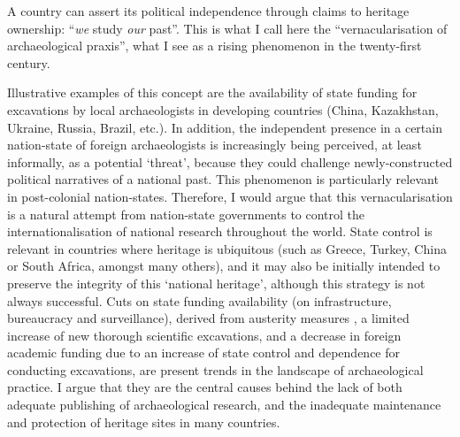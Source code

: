         A country can assert its political independence through claims to heritage ownership: “\emph{we} study \emph{our} past”. This is what I call here the “vernacularisation of archaeological praxis”, what I see as a rising phenomenon in the twenty-first century. 

        Illustrative examples of this concept are the availability of state funding for excavations by local archaeologists in developing countries (China, Kazakhstan, Ukraine, Russia, Brazil, etc.). In addition, the independent presence in a certain nation-state of foreign archaeologists is increasingly being perceived, at least informally, as a potential ‘threat’, because they could challenge newly-constructed political narratives of a national past. This phenomenon is particularly relevant in post-colonial nation-states.
        Therefore, I would argue that this vernacularisation is a natural attempt from nation-state governments to control the internationalisation of national research throughout the world. State control is relevant in countries where heritage is ubiquitous (such as Greece, Turkey, China or South Africa, amongst many others), and it may also be initially intended to preserve the integrity of this ‘national heritage’, although this strategy is not always successful. Cuts on state funding availability (on infrastructure, bureaucracy and surveillance), derived from austerity measures \parencite{Phillips_2012}, a limited increase of new thorough scientific excavations, and a decrease in foreign academic funding due to an increase of state control and dependence for conducting excavations, are present trends in the landscape of archaeological practice. I argue that they are the central causes behind the lack of both adequate publishing of archaeological research, and the inadequate maintenance and protection of heritage sites in many countries.
		
